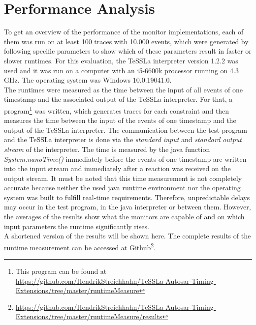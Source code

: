 \section{Performance Analysis}
\label{sec:performance}
To get an overview of the performance of the monitor implementations, each of them was run on at least 100 traces with 10.000 events, which were generated by following specific parameters to show which of these parameters result in faster or slower runtimes. For this evaluation, the TeSSLa interpreter version 1.2.2 was used and it was run on a computer with an i5-6600k processor running on 4.3 GHz. The operating system was Windows 10.0.19041.0.\\
The runtimes were measured as the time between the input of all events of one timestamp and the associated output of the TeSSLa interpreter. For that, a program\footnote{This program can be found at \href{https://github.com/HendrikStreichhahn/TeSSLa-Autosar-Timing-Extensions/tree/master/runtimeMeasure}{https://github.com/HendrikStreichhahn/TeSSLa-Autosar-Timing-Extensions/tree/master/runtimeMeasure}} was written, which generates traces for each constraint and then measures the time between the input of the events of one timestamp and the output of the TeSSLa interpreter. The communication between the test program and the TeSSLa interpreter is done via the \textit{standard input} and \textit{standard output stream} of the interpreter. The time is measured by the java function \textit{System.nanoTime()} immediately before the events of one timestamp are written into the input stream and immediately after a reaction was received on the output stream. It must be noted that this time measurement is not completely accurate because neither the used java runtime environment nor the operating system was built to fulfill real-time requirements. Therefore, unpredictable delays may occur in the test program, in the java interpreter or between them. However, the averages of the results show what the monitors are capable of and on which input parameters the runtime significantly rises.\\
A shortened version of the results will be shown here. The complete results of the runtime measurement can be accessed at Github\footnote{\href{https://github.com/HendrikStreichhahn/TeSSLa-Autosar-Timing-Extensions/tree/master/runtimeMeasure/results}{https://github.com/HendrikStreichhahn/TeSSLa-Autosar-Timing-Extensions/tree/master/runtimeMeasure/results}}.



